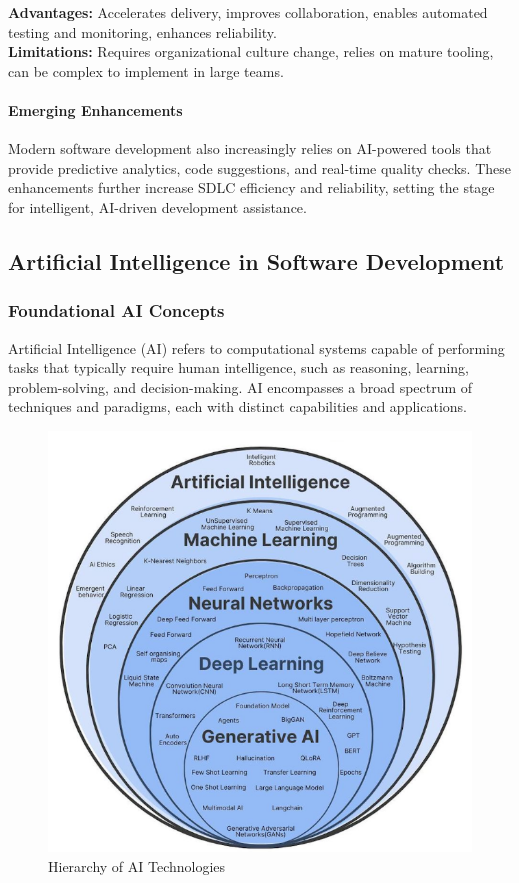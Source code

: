 \begin{spacing}{1.2}
\textbf{Advantages:} Accelerates delivery, improves collaboration, enables automated testing and monitoring, enhances reliability.\\
\textbf{Limitations:} Requires organizational culture change, relies on mature tooling, can be complex to implement in large teams.

\paragraph{Emerging Enhancements}
Modern software development also increasingly relies on AI-powered tools that provide predictive analytics, code suggestions, and real-time quality checks. These enhancements further increase SDLC efficiency and reliability, setting the stage for intelligent, AI-driven development assistance.



\subsection{Artificial Intelligence in Software Development}

\subsubsection*{Foundational AI Concepts}
Artificial Intelligence (AI) refers to computational systems capable of performing tasks that typically require human intelligence, such as reasoning, learning, problem-solving, and decision-making. AI encompasses a broad spectrum of techniques and paradigms, each with distinct capabilities and applications.

\begin{figure}[H]
    \centering
    \includegraphics[scale=0.6]{Images/AI.png}
    \caption{Hierarchy of AI Technologies}
    \label{fig:ai_hierarchy}
\end{figure}


\end{spacing}
